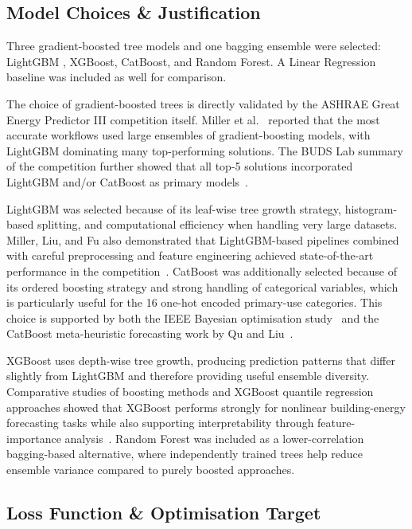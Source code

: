 \documentclass{article}
\begin{document}
\subsection{Model Choices \& Justification}

Three gradient-boosted tree models and one bagging ensemble were selected: LightGBM , XGBoost, CatBoost, and Random Forest. A Linear Regression baseline was included as well for comparison. 

The choice of gradient-boosted trees is directly validated by the ASHRAE Great Energy Predictor III competition itself. Miller et al.~\cite{miller2020} reported that the most accurate workflows used large ensembles of gradient-boosting models, with LightGBM dominating many top-performing solutions. The BUDS Lab summary of the competition further showed that all top-5 solutions incorporated LightGBM and/or CatBoost as primary models~\cite{budslab}.

LightGBM was selected because of its leaf-wise tree growth strategy, histogram-based splitting, and computational efficiency when handling very large datasets. Miller, Liu, and Fu also demonstrated that LightGBM-based pipelines combined with careful preprocessing and feature engineering achieved state-of-the-art performance in the competition~\cite{miller2022}. CatBoost was additionally selected because of its ordered boosting strategy and strong handling of categorical variables, which is particularly useful for the 16 one-hot encoded primary-use categories. This choice is supported by both the IEEE Bayesian optimisation study~\cite{catboostbayes} and the CatBoost meta-heuristic forecasting work by Qu and Liu~\cite{qu2026}.

XGBoost uses depth-wise tree growth, producing prediction patterns that differ slightly from LightGBM and therefore providing useful ensemble diversity. Comparative studies of boosting methods and XGBoost quantile regression approaches showed that XGBoost performs strongly for nonlinear building-energy forecasting tasks while also supporting interpretability through feature-importance analysis~\cite{gbmcomparison,xgboostshap}. Random Forest was included as a lower-correlation bagging-based alternative, where independently trained trees help reduce ensemble variance compared to purely boosted approaches.
\subsection{Loss Function \& Optimisation Target}
\end{document}
